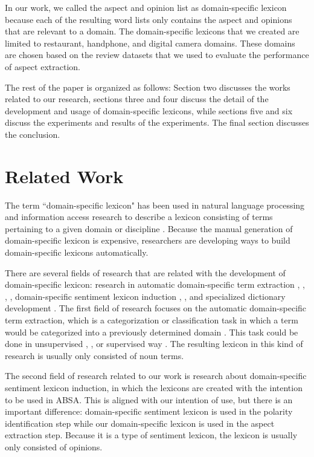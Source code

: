 \documentclass[a4paper,conference]{IEEEtran}
\begin{document}
In our work, we called the aspect and opinion list as domain-specific lexicon because each of the resulting word lists only contains the aspect and opinions that are relevant to a domain. The domain-specific lexicons that we created are limited to restaurant, handphone, and digital camera domains. These domains are chosen based on the review datasets that we used to evaluate the performance of aspect extraction.

The rest of the paper is organized as follows: Section two discusses the works related to our research, sections three and four discuss the detail of the development and usage of domain-specific lexicons, while sections five and six discuss the experiments and results of the experiments. The final section discusses the conclusion. 

\section{Related Work}
The term ``domain-specific lexicon" has been used in natural language processing and information access research to describe a lexicon consisting of terms pertaining to a given domain or discipline \cite{b3}. Because the manual generation of domain-specific lexicon is expensive, researchers are developing ways to build domain-specific lexicons automatically. 

There are several fields of research that are related with the development of domain-specific lexicon: research in automatic domain-specific term extraction \cite{b3}, \cite{b4}, \cite{b5}, \cite{b6}, domain-specific sentiment lexicon induction \cite{b7}, \cite{b8}, and specialized dictionary development \cite{b9}. The first field of research focuses on the automatic domain-specific term extraction, which is a categorization or classification task in which a term would be categorized into a previously determined domain \cite{b4}. This task could be done in unsupervised \cite{b3}, \cite{b4}, \cite{b5} or supervised way \cite{b6}. The resulting lexicon in this kind of research is usually only consisted of noun terms.

The second field of research related to our work is research about domain-specific sentiment lexicon induction, in which the lexicons are created with the intention to be used in ABSA. This is aligned with our intention of use, but there is an important difference: domain-specific sentiment lexicon is used in the polarity identification step while our domain-specific lexicon is used in the aspect extraction step. Because it is a type of sentiment lexicon, the lexicon is usually only consisted of opinions.
\end{document}
